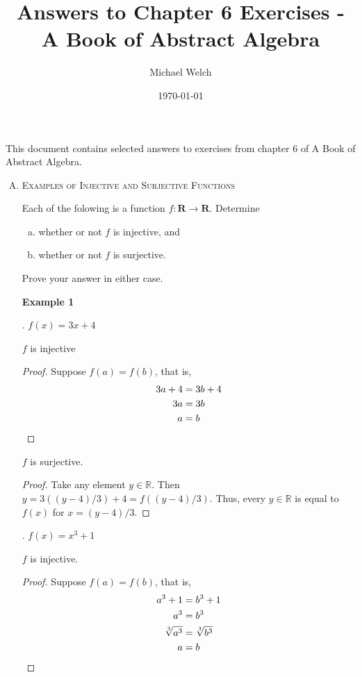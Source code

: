 \documentclass[twoside]{amsart}
\begin{document}
\title{Answers to Chapter 6 Exercises - A Book of Abstract Algebra}
\author{Michael Welch}
\date{\today}
\maketitle

This document contains selected answers to exercises from chapter 6
of A Book of Abstract Algebra.


\begin{enumerate}[A.]
   \item \textsc{Examples of Injective and Surjective Functions}

   \noindent Each of the folowing is a function $f:\mathbf{R}\to\mathbf{R}$.
   Determine
   \begin{enumerate}[(a)]
      \item whether or not $f$ is injective, and
      \item whether or not $f$ is surjective.
   \end{enumerate}
   \noindent Prove your answer in either case.

   \noindent \textbf{Example 1}

   . $f(x)=3x+4$

   \noindent $f$ is injective
   \begin{proof}
   Suppose $f(a)=f(b)$, that is, 
   \begin{align*}
       3a+4&=3b+4\\
       3a&=3b\\
       a&=b \qedhere
   \end{align*}
   \end{proof}

   \noindent $f$ is surjective. 
   \begin{proof}
   Take any element $y\in\mathbb{R}$. Then $y=3((y-4)/3) + 4=f((y-4)/3)$.
   Thus, every $y\in\mathbb{R}$ is equal to $f(x)$ for $x=(y-4)/3$.
   \end{proof}

   .  $f(x)=x^3+1$

   \noindent $f$ is injective.
   \begin{proof}
      Suppose $f(a)=f(b)$, that is,
      \begin{align*}
         a^3+1 &= b^3+1 \\
	 a^3   &= b^3   \\
	 \sqrt[3]{a^3} &= \sqrt[3]{b^3}\\
	 a &= b \qedhere
      \end{align*}
   \end{proof}


\end{enumerate}
\end{document}
